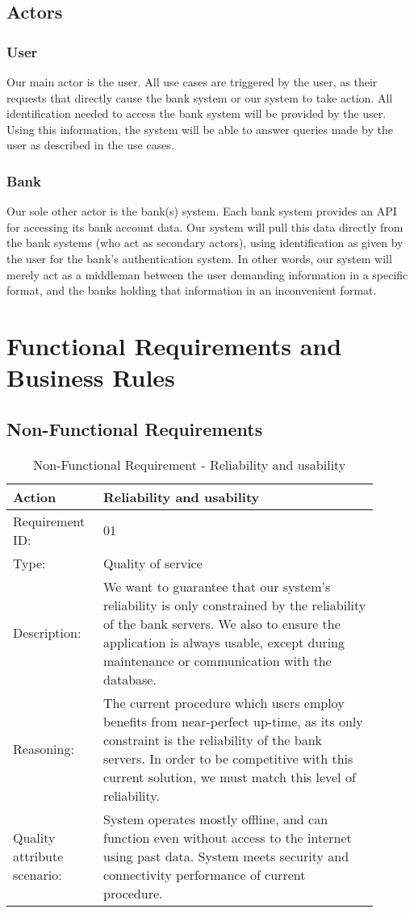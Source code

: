 \documentclass[11pt]{article}
\newcounter{use case ID}
\newcommand\addrow[2]{#1 & #2\\ \hline}
\newcounter{req ID}
\newcommand\tabularheadfsd[1]{
\begin{table}[ht]
    \addtocounter{req ID}{1}
    \caption{Non-Functional Requirement \arabic{req ID} - #1}
    \vspace{0.2cm}
    \begin{tabular}{|p{0.2\linewidth}|p{0.70\linewidth}|}
    \hline
        \textbf{Action} & \textbf{#1} \\
        \hline}
\newenvironment{requirement}{\tabularheadfsd}
{\hline\end{tabular}\end{table}}
\begin{document}
\begin{table}[H]
\begin{center}
{\begin{tabular}{|l|p{0.8\linewidth}|}
\end{tabular}}
\end{center}
\end{table}


\subsection{Actors} \label{actors}
\subsubsection{User}
Our main actor is the user. All use cases are triggered by the user, as their requests that directly cause the bank system or our system to take action. All identification needed to access the bank system will be provided by the user. Using this information, the system will be able to answer queries made by the user as described in the use cases.
\subsubsection{Bank}
Our sole other actor is the bank(s) system. Each bank system provides an API for accessing its bank account data. Our system will pull this data directly from the bank systems (who act as secondary actors), using identification as given by the user for the bank's authentication system. In other words, our system will merely act as a middleman between the user demanding information in a specific format, and the banks holding that information in an inconvenient format.


\section{Functional Requirements and Business Rules} \label{nonfunc req}
\subsection{Non-Functional Requirements}
\begin{requirement}{Reliability and usability}
    \addrow{Requirement ID:}{01}
    \addrow{Type:}{Quality of service}
    \addrow{Description:}{We want to guarantee that our system's reliability is only constrained by the reliability of the bank servers. We also to ensure the application is always usable, except during maintenance or communication with the database.}
    \addrow{Reasoning:}{The current procedure which users employ benefits from near-perfect up-time, as its only constraint is the reliability of the bank servers. In order to be competitive with this current solution, we must match this level of reliability.}
    \addrow{Quality attribute scenario:}{System operates mostly offline, and can function even without access to the internet using past data. System meets security and connectivity performance of current procedure.}
\end{requirement}
\end{document}
